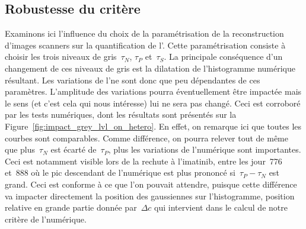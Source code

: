 \documentclass[main.tex]{subfiles}
\begin{document}
\subsection{Robustesse du critère}
Examinons ici l'influence du choix de la paramétrisation de la reconstruction d'images scanners sur la quantification de l'\hetero. 
Cette paramétrisation consiste à choisir les trois niveaux de gris~$\tau_N$, $\tau_P$ et~$\tau_S$.  
La principale conséquence d'un changement de ces niveaux de gris est la dilatation de l'histogramme numérique résultant.  
Les variations de l'\hetero ne sont donc que peu dépendantes de ces paramètres. L'amplitude des variations pourra éventuellement être impactée mais le sens (et c'est cela qui nous intéresse) lui ne sera pas changé. 
Ceci est corroboré par les tests numériques, dont les résultats sont présentés sur la Figure~\ref{fig:impact_grey_lvl_on_hetero}. 
En effet, on remarque ici que toutes les courbes sont comparables. Comme différence, on pourra relever tout de même que plus~$\tau_N$ est écarté de~$\tau_P$, plus les variations de l'\hetero numérique sont importantes. Ceci est notamment visible lors de la rechute à l'imatinib, entre les jour~776 et~888 où le pic descendant de l'\hetero numérique est plus prononcé si~$\tau_P-\tau_N$ est grand. Ceci est conforme à ce que l'on pouvait attendre, puisque cette différence va impacter directement la position des gaussiennes sur l'histogramme, position relative en grande partie donnée par~$\Delta c$ qui intervient dans le calcul de notre critère de l'\hetero numérique. 

\end{document}

